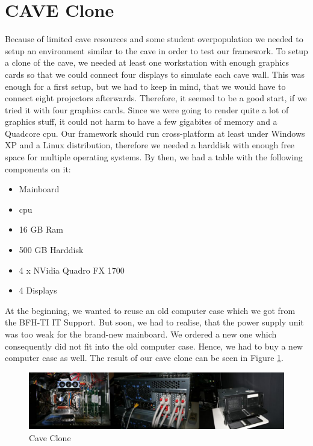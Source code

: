 \section{CAVE Clone}
Because of limited \gls{cave} resources and some student overpopulation we needed to setup an environment similar to the \gls{cave} in order to test our framework. To setup a clone of the \gls{cave}, we needed at least one workstation with enough graphics cards so that we could connect four displays to simulate each \gls{cave} wall. This was enough for a first setup, but we had to keep in mind, that we would have to connect eight projectors afterwards. Therefore, it seemed to be a good start, if we tried it with four graphics cards. Since we were going to render quite a lot of graphics stuff, it could not harm to have a few gigabites of memory and a Quadcore \gls{cpu}. Our framework should run cross-platform at least under Windows XP and a Linux distribution, therefore we needed a harddisk with enough free space for multiple operating systems. By then, we had a table with the following components on it:
\begin{itemize}
	\item Mainboard 
	\item \gls{cpu}
	\item 16 GB Ram
	\item 500 GB Harddisk
	\item 4 x NVidia Quadro FX 1700
	\item 4 Displays
\end{itemize}

At the beginning, we wanted to reuse an old computer case which we got from the BFH-TI IT Support. But soon, we had to realise, that the power supply unit was too weak for the brand-new mainboard. We ordered a new one which consequently did not fit into the old computer case. Hence, we had to buy a new computer case as well. 
The result of our \gls{cave} clone can be seen in Figure \ref{fig:cave_clone}.

\begin{figure}[H]
	\centering
	\includegraphics[width=1\textwidth]{../figures/fotos/cave_clone}
	\caption{Cave Clone}
	\label{fig:cave_clone}
\end{figure}


